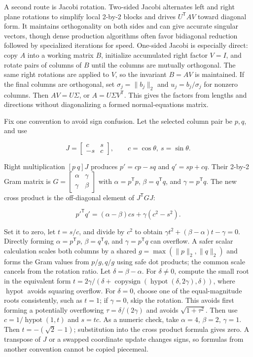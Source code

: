 \hypertarget{02-foundations-ii-ch038-jacobi-svd-removes-column-coupling-pair-by-pair}{}

A second route is Jacobi rotation. Two-sided Jacobi alternates left and right plane rotations to simplify local 2-by-2 blocks and drives \(U^\mathsf TAV\) toward diagonal form. It maintains orthogonality on both sides and can give accurate singular vectors, though dense production algorithms often favor bidiagonal reduction followed by specialized iterations for speed. One-sided Jacobi is especially direct: copy \(A\) into a working matrix \(B\), initialize accumulated right factor \(V=I\), and rotate pairs of columns of \(B\) until the columns are mutually orthogonal. The same right rotations are applied to \(V\), so the invariant \(B=AV\) is maintained. If the final columns are orthogonal, set \(\sigma_j=\|b_j\|_2\) and \(u_j=b_j/\sigma_j\) for nonzero columns. Then \(AV=U\Sigma\), or \(A=U\Sigma V^\mathsf T\). This gives the factors from lengths and directions without diagonalizing a formed normal-equations matrix.

Fix one convention to avoid sign confusion. Let the selected column pair be \(p,q\), and use

\[
J=\begin{bmatrix}c&s\\-s&c\end{bmatrix},\qquad c=\cos\theta,\ s=\sin\theta.
\]

Right multiplication \([p\ q]J\) produces \(p'=cp-sq\) and \(q'=sp+cq\). Their 2-by-2 Gram matrix is \(G=\begin{bmatrix}\alpha&\gamma\\\gamma&\beta\end{bmatrix}\) with \(\alpha=p^\mathsf Tp\), \(\beta=q^\mathsf Tq\), and \(\gamma=p^\mathsf Tq\). The new cross product is the off-diagonal element of \(J^\mathsf TGJ\):

\[
{p'}^\mathsf Tq'=(\alpha-\beta)cs+\gamma(c^2-s^2).
\]

Set it to zero, let \(t=s/c\), and divide by \(c^2\) to obtain \(\gamma t^2+(\beta-\alpha)t-\gamma=0\). Directly forming \(\alpha=p^\mathsf Tp\), \(\beta=q^\mathsf Tq\), and \(\gamma=p^\mathsf Tq\) can overflow. A safer scalar calculation scales both columns by a shared \(g=\max(\|p\|_2,\|q\|_2)\) and forms the Gram values from \(p/g,q/g\) using safe dot products; the common scale cancels from the rotation ratio. Let \(\delta=\beta-\alpha\). For \(\delta\ne0\), compute the small root in the equivalent form \(t=2\gamma/(\delta+\operatorname{copysign}(\operatorname{hypot}(\delta,2\gamma),\delta))\), where \(\operatorname{hypot}\) avoids squaring overflow. For \(\delta=0\), choose one of the equal-magnitude roots consistently, such as \(t=1\); if \(\gamma=0\), skip the rotation. This avoids first forming a potentially overflowing \(\tau=\delta/(2\gamma)\) and avoids \(\sqrt{1+\tau^2}\). Then use \(c=1/\operatorname{hypot}(1,t)\) and \(s=tc\). As a numeric check, take \(\alpha=4\), \(\beta=2\), \(\gamma=1\). Then \(t=-(\sqrt2-1)\); substitution into the cross product formula gives zero. A transpose of \(J\) or a swapped coordinate update changes signs, so formulas from another convention cannot be copied piecemeal.

